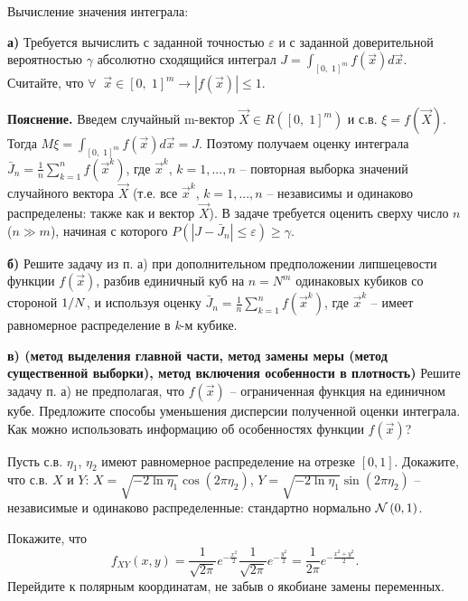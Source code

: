 \begin{problem}
Вычисление значения интеграла:

 \textbf{а)} Требуется вычислить с заданной точностью $\varepsilon $ и с заданной доверительной вероятностью $\gamma $ абсолютно сходящийся интеграл $J=\int _{\left[0,\; 1\right]^{m} }f\left(\vec{x}\right)d\vec{x} $. Считайте, что $\forall \; \; \vec{x}\in \left[0,\; 1\right]^{m} \to \left|f\left(\vec{x}\right)\right|\le 1$.

\noindent \textbf{Пояснение. }Введем случайный m-вектор $\vec{X}\in R\left(\left[0,\; 1\right]^{m} \right)$ и с.в. $\xi =f\left(\vec{X}\right)$. Тогда $M\xi =\int _{\left[0,\; 1\right]^{m} }f\left(\vec{x}\right)d\vec{x} =J$. Поэтому получаем оценку интеграла $\bar{J}_{n} =\frac{1}{n} \sum _{k=1}^{n}f\left(\vec{x}^{k} \right) $, где $\vec{x}^{k} $, $k=1,...,n$ -- повторная выборка значений случайного вектора $\vec{X}$ (т.е. все $\vec{x}^{k} $, $k=1,...,n$ -- независимы и одинаково распределены: также как и вектор $\vec{X}$). В задаче требуется оценить сверху число $n$ ($n\gg m$), начиная с которого $P\left(\left|J-\bar{J}_{n} \right|\le \varepsilon \right)\ge \gamma $.

\textbf{б) }Решите задачу из п. а) при дополнительном предположении липшецевости функции $f\left(\vec{x}\right)$, разбив единичный куб на $n=N^{m} $ одинаковых кубиков со стороной ${1\mathord{\left/ {\vphantom {1 N}} \right. \kern-\nulldelimiterspace} N} $, и используя оценку $\bar{J}_{n} =\frac{1}{n} \sum _{k=1}^{n}f\left(\vec{x}^{k} \right) $, где $\vec{x}^{k} $ -- имеет равномерное распределение в \textit{k}-м кубике.

\textbf{в) (метод выделения главной части, метод замены меры (метод существенной выборки), метод включения особенности в плотность) }Решите задачу п. а) не предполагая, что $f\left(\vec{x}\right)$ -- ограниченная функция на единичном кубе. Предложите способы уменьшения дисперсии полученной оценки интеграла. Как можно использовать информацию об особенностях функции $f\left(\vec{x}\right)$?

\end{problem}

\begin{problem}
Пусть с.в. $\eta _{1} $, $\eta _{2} $ имеют равномерное распределение на отрезке $\left[0,1\right]$. Докажите, что с.в. $X$ и $Y$: $X=\sqrt{-2\ln \eta _{1} } \cos \left(2\pi \eta _{2} \right)$, $Y=\sqrt{-2\ln \eta _{1} } \sin \left(2\pi \eta _{2} \right)$ -- независимые и одинаково распределенные: стандартно нормально ${\rm {\mathcal N}}\left(0,1\right)$.

\begin{ordre}
Покажите, что
\[f_{XY} (x,y)=\frac{1}{\sqrt{2\pi } } e^{-\frac{x^{2} }{2} } \frac{1}{\sqrt{2\pi } } e^{-\frac{y^{2} }{2} } =\frac{1}{2\pi } e^{-\frac{x^{2} +y^{2} }{2} } .\] 
Перейдите к полярным координатам, не забыв о якобиане замены переменных.
\end{ordre}

\end{problem}

